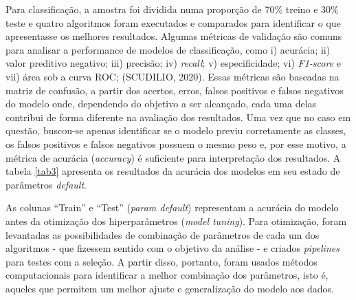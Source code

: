 \documentclass[twocolumn]{rbef}
\newcommand{\1}{\mathbbm{1}}
\begin{document}
\newline\linebreak Para classificação, a amostra foi dividida numa proporção de 70\% treino e 30\% teste e quatro algoritmos foram executados e comparados para identificar o que apresentasse os melhores resultados.
Algumas métricas de validação são comuns para analisar a performance de modelos de classificação, como i) acurácia; ii) valor preditivo negativo; iii) precisão; iv) \emph{recall}; v) especificidade; vi) \emph{F1-score} e vii) área sob a curva ROC; (SCUDILIO, 2020)\cite{SCUDILIO}. Essas métricas são baseadas na matriz de confusão, a partir dos acertos, erros, falsos positivos e falsos negativos do modelo onde, dependendo do objetivo a ser alcançado, cada uma delas contribui de forma diferente na avaliação dos resultados. Uma vez que no caso em questão, buscou-se apenas identificar se o modelo previu corretamente as classes, os falsos positivos e falsos negativos possuem o mesmo peso e, por esse motivo, a métrica de acurácia (\emph{accuracy}) é suficiente para interpretação dos resultados. A tabela \ref{tab3} apresenta os resultados da acurácia dos modelos em seu estado de parâmetros \emph{default}.
\begin{table}[!htb]
\caption{Classificadores: parâmetros default}
\label{tab3}
\end{table}
\newline\linebreak As colunas “Train” e “Test” (\emph{param default}) representam a acurácia do modelo antes da otimização dos hiperparâmetros (\emph{model tuning}). Para otimização, foram levantadas as possibilidades de combinação de parâmetros de cada um dos algoritmos - que fizessem sentido com o objetivo da análise - e criados \emph{pipelines} para testes com a seleção. A partir disso, portanto, foram usados métodos computacionais para identificar a melhor combinação dos parâmetros, isto é, aqueles que permitem um melhor ajuste e generalização do modelo aos dados.
\end{document}
